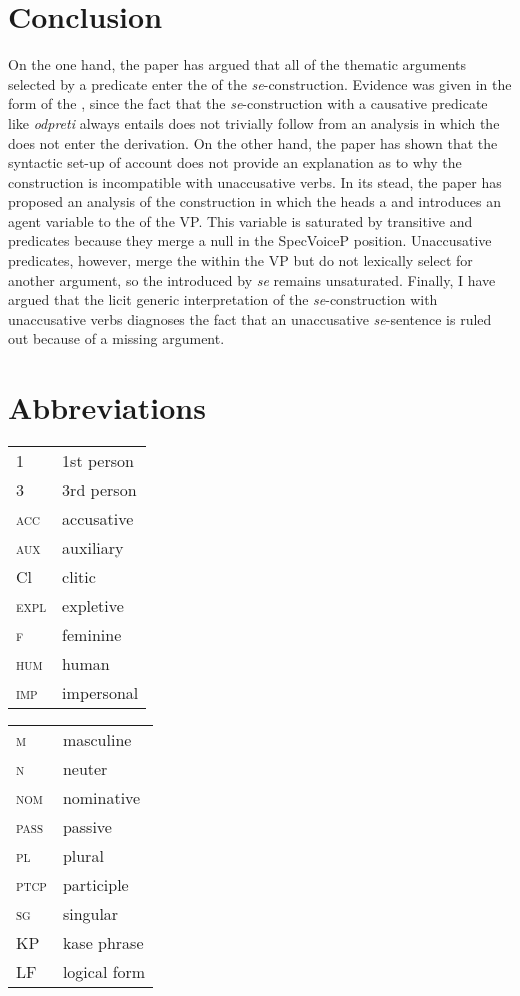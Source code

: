 \documentclass[output=paper,nonflat,newtxmath]{langsci/langscibook}
\begin{document}
\section{Conclusion} \label{sec5}
On the one hand, the paper has argued that all of the thematic arguments selected by a predicate enter the  of the  \textit{se}-construction. Evidence was given in the form of the , since the fact that the  \textit{se}-construction with a causative predicate like \textit{odpreti} always entails  does not trivially follow from an analysis in which the  does not enter the derivation. On the other hand, the paper has shown that the syntactic set-up of  account does not provide an explanation as to why the construction is incompatible with unaccusative verbs. In its stead, the paper has proposed an analysis of the construction in which the  heads a  and introduces an agent variable to the  of the VP. This variable is saturated by transitive and  predicates because they merge a null  in the SpecVoiceP position. Unaccusative predicates, however, merge the  within the VP but do not lexically select for another argument, so the  introduced by \textit{se} remains unsaturated. Finally, I have argued that the licit generic interpretation of the  \textit{se}-construction with unaccusative verbs diagnoses the fact that an unaccusative \textit{se}-sentence is ruled out because of a missing argument.


\section*{Abbreviations}
\begin{tabularx}{.45\textwidth}{lX}
\textsc{1}&1st person\\
\textsc{3}&3rd person\\
\textsc{acc}&{accusative}\\
\textsc{aux}&auxiliary\\
{Cl}&{clitic}\\
\textsc{expl}&{expletive}\\
\textsc{f}&feminine\\
\textsc{hum}&human\\
\textsc{imp}&{impersonal}\\
\end{tabularx}
\begin{tabularx}{.45\textwidth}{lX}
\textsc{m}&masculine\\
\textsc{n}&neuter\\
\textsc{nom}&nominative\\
\textsc{pass}&passive\\
\textsc{pl}&plural\\
\textsc{ptcp}&{participle}\\
\textsc{sg}&singular\\
{KP}&{kase phrase}\\
LF& logical form\\
\end{tabularx}
\end{document}
